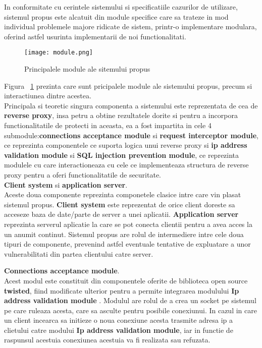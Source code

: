 In conformitate cu cerintele sistemului si specificatiile cazurilor de utilizare, sistemul propus este alcatuit din module specifice care sa trateze in mod individual problemele majore ridicate de sistem, printr-o implementare modulara, oferind astfel usurinta implementarii de noi functionalitati.

\begin{figure}[h]
	\centering
	\texttt{[image: module.png]}
	\caption{Principalele module ale sitemului propus}
	\label{fig:module}
\end{figure}
Figura ~\ref{fig:module} prezinta care sunt pricipalele module ale sistemului propus, precum si interactiunea dintre acestea. \\

Principala si teoretic singura componenta a sistemului este reprezentata de cea de \textbf{reverse proxy}, insa petru a obtine rezultatele dorite si pentru a incorpora functionalitatile de protecti in aceasta, ea a fost impartita in cele 4 submodule:\textbf{connections acceptance module} si \textbf{request interceptor module}, ce reprezinta componentele ce suporta logica unui reverse proxy si \textbf{ip address validation module} si \textbf{SQL injection prevention module}, ce reprezinta modulele cu care interactioneaza cu cele ce implementeaza structura de reverse proxy pentru a oferi functionalitatile de securitate.\\




\textbf{Client system} si  \textbf{application server}.\\ 

Aceste doua componente reprezinta componetele clasice intre care vin plasat sistemul propus. \textbf{Client system} este reprezentat de orice client doreste sa acceseze baza de date/parte de server a unei aplicatii. \textbf{Application server} reprezinta serverul aplicatie la care se pot conecta clientii pentru a avea acces la un anumit continut. Sistemul propus are rolul de intermediere intre cele doua tipuri de componente, prevenind astfel eventuale tentative de expluatare a unor vulnerabilitati din partea clientului catre server.


\textbf{Connections acceptance module}.\\

Acest modul este constituit din componentele oferite de biblioteca open source \textbf{twisted}, fiind modificate ulterior pentru a permite integrarea modulului \textbf{Ip address validation module} . Modulul are rolul de a crea un socket pe sistemul pe care ruleaza acesta, care sa asculte pentru posibile conexiunui. In cazul in care un client incearca sa initieze o noua conexiune acesta trasmite adresa ip a clietului catre modului \textbf{Ip address validation module}, iar in functie de raspunsul acestuia conexiunea acestuia va fi realizata sau refuzata.\\ 



